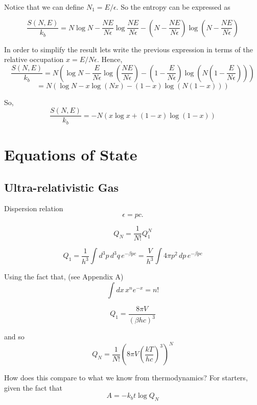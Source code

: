 \documentclass[10pt,twoside,openright]{memoir}
\begin{document}
Notice that we can define $N_1 = E / \epsilon$. So the entropy can be expressed as

$$
\frac{S(N,E)}{k_b} = N \log N - \frac{NE}{N \epsilon} \log \frac{NE}{N \epsilon} - \left( N- \frac{NE}{N \epsilon} \right) \log \left( N- \frac{NE}{N \epsilon} \right)
$$

In order to simplify the result lets write the previous expression in terms of the relative occupation $x = E/ N \epsilon $. Hence,
$$
\frac{S(N,E)}{k_b} = N \left( \log N - \frac{E}{N \epsilon}  \log \left( \frac{NE}{N \epsilon} \right) - \left( 1 -  \frac{E}{N \epsilon} \right) \log \left( N \left( 1 - \frac{E}{N \epsilon} \right) \right) \right)
$$$$
= N \left( \log N - x \log \left( Nx \right)  - \left(  1 - x \right) \log \left(  N\left( 1 - x \right) \right) \right)
$$

So,
$$
\frac{S(N,E)}{k_b} = -N \left( x \log x + \left( 1-x \right) \log \left( 1-x \right) \right)
$$
 

\section{\label{sec:level2} Equations of State}

\subsection{Ultra-relativistic Gas}

Dispersion relation
\begin{equation}
\epsilon = pc.
\end{equation}

\begin{equation}
Q_N = \frac{1}{N!}Q_{1}^{N}
\end{equation}

$$
Q_1 = \frac{1}{h^3} \int d^3p \, d^3q \, e^{-\beta p c} = \frac{V}{h^3} \int 4 \pi p^2 \, dp \, e^{-\beta p c}
$$

Using the fact that, (see Appendix A)
$$ \int dx \, x^n e^{-x} = n! $$

$$
Q_1 = \frac{8 \pi V}{\left( \beta h c \right)^3}
$$

and so
\begin{equation}
Q_N = \frac{1}{N!} \left( 8 \pi V \left( \frac{kT}{hc} \right)^3 \right)^N
\end{equation}

How does this compare to what we know from thermodynamics?
For starters, given the fact that
\begin{equation}
A = - k_b t \log Q_N
\end{equation}
\end{document}
